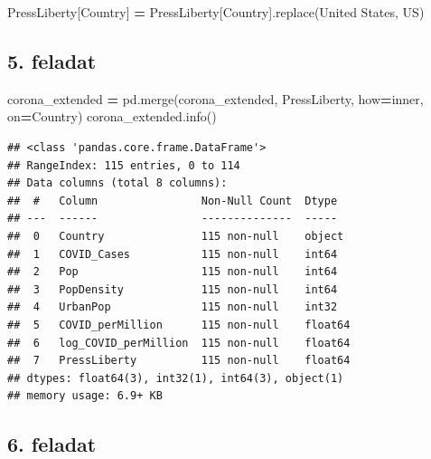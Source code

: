 \documentclass[
]{book}
\newenvironment{Shaded}{\begin{snugshade}}{\end{snugshade}}
\newcommand{\NormalTok}[1]{#1}
\newcommand{\OperatorTok}[1]{\textcolor[rgb]{0.81,0.36,0.00}{\textbf{#1}}}
\newcommand{\StringTok}[1]{\textcolor[rgb]{0.31,0.60,0.02}{#1}}
\begin{document}
\begin{Shaded}
\begin{Highlighting}[]
\NormalTok{PressLiberty[}\StringTok{\textquotesingle{}Country\textquotesingle{}}\NormalTok{] }\OperatorTok{=}\NormalTok{ PressLiberty[}\StringTok{\textquotesingle{}Country\textquotesingle{}}\NormalTok{].replace(}\StringTok{\textquotesingle{}United States\textquotesingle{}}\NormalTok{, }\StringTok{\textquotesingle{}US\textquotesingle{}}\NormalTok{)}
\end{Highlighting}
\end{Shaded}

\subsection*{5. feladat}\label{feladat-4}

\begin{Shaded}
\begin{Highlighting}[]
\NormalTok{corona\_extended }\OperatorTok{=}\NormalTok{ pd.merge(corona\_extended, PressLiberty, how}\OperatorTok{=}\StringTok{\textquotesingle{}inner\textquotesingle{}}\NormalTok{, on}\OperatorTok{=}\StringTok{\textquotesingle{}Country\textquotesingle{}}\NormalTok{)}
\NormalTok{corona\_extended.info()}
\end{Highlighting}
\end{Shaded}

\begin{verbatim}
## <class 'pandas.core.frame.DataFrame'>
## RangeIndex: 115 entries, 0 to 114
## Data columns (total 8 columns):
##  #   Column                Non-Null Count  Dtype  
## ---  ------                --------------  -----  
##  0   Country               115 non-null    object 
##  1   COVID_Cases           115 non-null    int64  
##  2   Pop                   115 non-null    int64  
##  3   PopDensity            115 non-null    int64  
##  4   UrbanPop              115 non-null    int32  
##  5   COVID_perMillion      115 non-null    float64
##  6   log_COVID_perMillion  115 non-null    float64
##  7   PressLiberty          115 non-null    float64
## dtypes: float64(3), int32(1), int64(3), object(1)
## memory usage: 6.9+ KB
\end{verbatim}

\subsection*{6. feladat}\label{feladat-5}
\end{document}

